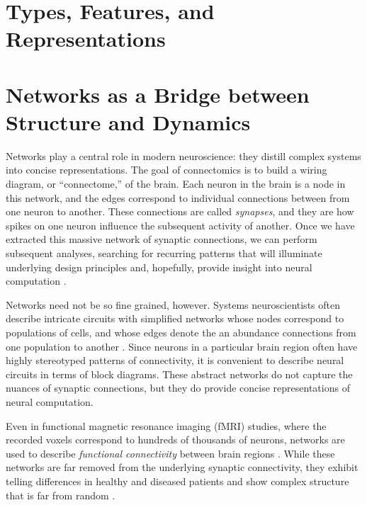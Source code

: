 \section{Types, Features, and Representations}


\section{Networks as a Bridge between Structure and Dynamics}
Networks play a central role in modern neuroscience: they distill
complex systems into concise representations.  The goal of
connectomics \cite{sporns2005human} is to build a wiring diagram, or
``connectome,'' of the brain. Each neuron in the brain is a node in
this network, and the edges correspond to individual connections
between from one neuron to another. These connections are called
\emph{synapses}, and they are how spikes on one neuron influence the
subsequent activity of another.  Once we have extracted this massive
network of synaptic connections, we can perform subsequent analyses,
searching for recurring patterns that will illuminate underlying
design principles and, hopefully, provide insight into neural
computation \cite{bullmore2009complex}.


Networks need not be so fine grained, however.  Systems neuroscientists
often describe intricate circuits with simplified networks whose nodes
correspond to populations of cells, and whose edges denote the an
abundance connections from one population to another
\cite[e.g.]{felleman1991distributed, scannell1999connectional}.  Since
neurons in a particular brain region often have highly stereotyped
patterns of connectivity, it is convenient to describe neural circuits
in terms of block diagrams.  These abstract networks do not capture
the nuances of synaptic connections, but they do provide concise
representations of neural computation.

Even in functional magnetic resonance imaging (fMRI) studies, where the
recorded voxels correspond to hundreds of thousands of neurons, networks
are used to describe \emph{functional connectivity} between brain regions
\cite{friston1994functional}. While these networks are far removed from
the underlying synaptic connectivity, they exhibit telling differences
in healthy and diseased patients \cite{bassett2008hierarchical}
and show complex structure that is far from random \cite{bassett2006small}.

